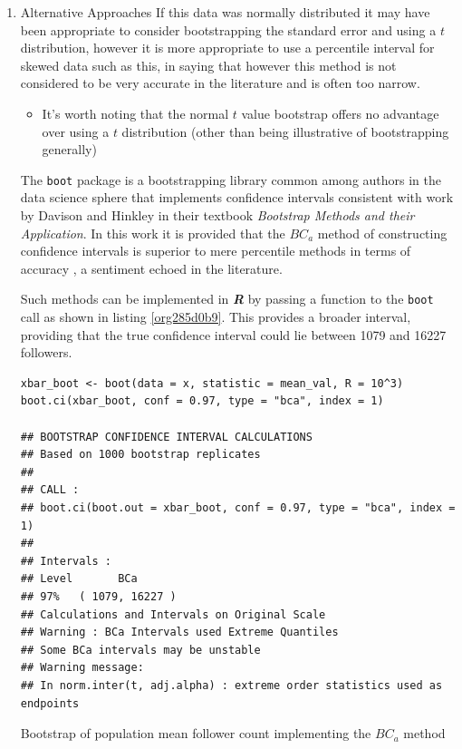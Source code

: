 \documentclass[11pt]{article}
\begin{document}
\begin{enumerate}
\item Alternative Approaches
\label{sec:org11b2c15}
If this data was normally distributed it may have been appropriate to consider
bootstrapping the standard error and using a \(t\) distribution, however it is more appropriate to use a
percentile interval for skewed data such as this, in saying that however this method is not considered to be very accurate in the literature and is often too narrow. \cite[Section 4.1]{hesterberg2015}

\begin{itemize}
\item It's worth noting that the normal \(t\) value bootstrap offers no advantage over
using a \(t\) distribution (other than being illustrative of bootstrapping
generally) \cite[Section 4.1]{hesterberg2015}
\end{itemize}


 The \texttt{boot} package is a bootstrapping library common among authors in the data science sphere
 \cite[p. 295]{james2013} \cite[p. 237]{wiley2019} that implements
 confidence intervals consistent with work by Davison and Hinkley
 \cite{ripley2020} in their textbook \emph{Bootstrap Methods and their Application}.
In this work it is provided that the \(BC_{a}\) method of constructing confidence
 intervals is  superior to mere percentile
 methods in terms of accuracy \cite[Ch. 5]{davison1997}, a sentiment echoed in the literature. \cite[Ch. 5]{carpenter2000,davison1997}

Such methods can be implemented in \textbf{\emph{R}} by passing a function to the \texttt{boot} call as shown in listing \ref{org285d0b9}. This provides a broader interval, providing that the true confidence interval could lie between 1079 and 16227 followers.

\begin{listing}[htbp]
\begin{verbatim}
xbar_boot <- boot(data = x, statistic = mean_val, R = 10^3)
boot.ci(xbar_boot, conf = 0.97, type = "bca", index = 1)

## BOOTSTRAP CONFIDENCE INTERVAL CALCULATIONS
## Based on 1000 bootstrap replicates
##
## CALL :
## boot.ci(boot.out = xbar_boot, conf = 0.97, type = "bca", index = 1)
##
## Intervals :
## Level       BCa
## 97%   ( 1079, 16227 )
## Calculations and Intervals on Original Scale
## Warning : BCa Intervals used Extreme Quantiles
## Some BCa intervals may be unstable
## Warning message:
## In norm.inter(t, adj.alpha) : extreme order statistics used as endpoints
\end{verbatim}
\caption{\label{org285d0b9}Bootstrap of population mean follower count implementing the \(BC_{a}\) method}
\end{listing}
\end{enumerate}
\end{document}
